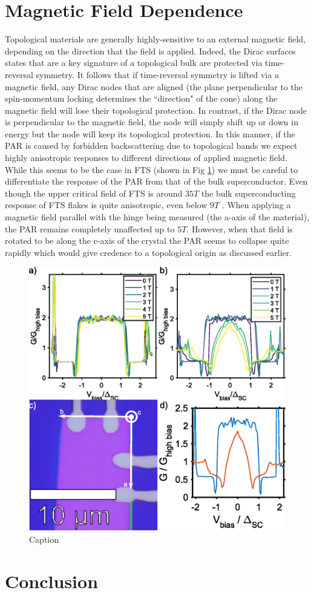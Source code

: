\section{Magnetic Field Dependence}
Topological materials are generally highly-sensitive to an external magnetic field, depending on the direction that the field is applied. Indeed, the Dirac surfaces states that are a key signature of a topological bulk are protected via time-reversal symmetry. It follows that if time-reversal symmetry is lifted via a magnetic field, any Dirac nodes that are aligned (the plane perpendicular to the spin-momentum locking determines the ``direction" of the cone) along the magnetic field will lose their topological protection. In contrast, if the Dirac node is perpendicular to the magnetic field, the node will simply shift up or down in energy but the node will keep its topological protection. In this manner, if the \ac{PAR} is caused by forbidden backscattering due to topological bands we expect highly anisotropic responses to different directions of applied magnetic field. While this seems to be the case in \ac{FTS} (shown in Fig \ref{fig:PARField}) we must be careful to differentiate the response of the \ac{PAR} from that of the bulk superconductor. Even though the upper critical field of \ac{FTS} is around $35 T$  the bulk superconducting response of \ac{FTS} flakes is quite anisotropic, even below $9 T$ \cite{zalic2019}. When applying a magnetic field parallel with the hinge being measured (the a-axis of the material), the \ac{PAR} remains completely unaffected up to $5 T$. However, when that field is rotated to be along the c-axis of the crystal the \ac{PAR} seems to collapse quite rapidly which would give credence to a topological origin as discussed earlier. 
\begin{figure}
    \centering
    \includegraphics[width = \textwidth]{Chap4/Figures/MagneticField.eps}
    \caption{Caption}
    \label{fig:PARField}
\end{figure}
\section{Conclusion}